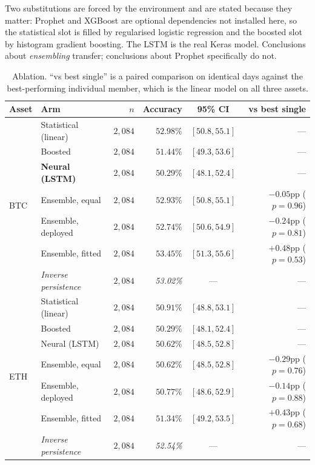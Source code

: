 \documentclass[preprint,12pt,authoryear]{elsarticle}
\begin{document}
Two substitutions are forced by the environment and are stated because they
matter: Prophet and XGBoost are optional dependencies not installed here, so the
statistical slot is filled by regularised logistic regression and the boosted
slot by histogram gradient boosting. The LSTM is the real Keras model.
Conclusions about \emph{ensembling} transfer; conclusions about Prophet
specifically do not.

\begin{table}[t]\centering\small
\caption{Ablation. ``vs best single'' is a paired comparison on identical days
against the best-performing individual member, which is the linear model on all
three assets.}
\label{tab:ablation}
\begin{tabular}{@{}llrrcr@{}}
\toprule
Asset & Arm & $n$ & Accuracy & 95\% CI & vs best single \\
\midrule
\multirow{7}{*}{BTC}
 & Statistical (linear)  & $2{,}084$ & $\mathbf{52.98\%}$ & $[50.8, 55.1]$ & --- \\
 & Boosted               & $2{,}084$ & $51.44\%$ & $[49.3, 53.6]$ & --- \\
 & \textbf{Neural (LSTM)}& $2{,}084$ & $50.29\%$ & $[48.1, 52.4]$ & --- \\
 & Ensemble, equal       & $2{,}084$ & $52.93\%$ & $[50.8, 55.1]$ & $-0.05$pp ($p=0.96$) \\
 & Ensemble, deployed    & $2{,}084$ & $52.74\%$ & $[50.6, 54.9]$ & $-0.24$pp ($p=0.81$) \\
 & Ensemble, fitted      & $2{,}084$ & $53.45\%$ & $[51.3, 55.6]$ & $+0.48$pp ($p=0.53$) \\
 & \textit{Inverse persistence} & $2{,}084$ & \textit{53.02\%} & --- & --- \\
\midrule
\multirow{7}{*}{ETH}
 & Statistical (linear)  & $2{,}084$ & $\mathbf{50.91\%}$ & $[48.8, 53.1]$ & --- \\
 & Boosted               & $2{,}084$ & $50.29\%$ & $[48.1, 52.4]$ & --- \\
 & Neural (LSTM)         & $2{,}084$ & $50.62\%$ & $[48.5, 52.8]$ & --- \\
 & Ensemble, equal       & $2{,}084$ & $50.62\%$ & $[48.5, 52.8]$ & $-0.29$pp ($p=0.76$) \\
 & Ensemble, deployed    & $2{,}084$ & $50.77\%$ & $[48.6, 52.9]$ & $-0.14$pp ($p=0.88$) \\
 & Ensemble, fitted      & $2{,}084$ & $51.34\%$ & $[49.2, 53.5]$ & $+0.43$pp ($p=0.68$) \\
 & \textit{Inverse persistence} & $2{,}084$ & \textit{52.54\%} & --- & --- \\

\end{tabular}
\end{table}
\end{document}
